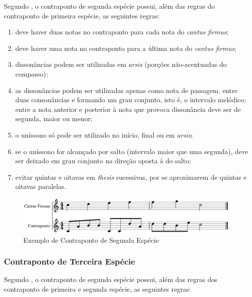         Segundo , o contraponto de segunda espécie possui, além das regras do contraponto de primeira espécie, as seguintes regras:

        \begin{enumerate}
          \item deve haver duas notas no contraponto para cada nota do \textit{cantus firmus};
          \item deve haver uma nota no contraponto para a última nota do \textit{cantus firmus};
          \item dissonâncias podem ser utilizadas em \textit{arsis} (porções não-acentuadas do compasso);
          \item as dissonâncias podem ser utilizadas apenas como nota de passagem, entre duas consonâncias e formando um grau conjunto, isto é, o intervalo melódico; entre a nota anterior e posterior à nota que provoca dissonância deve ser de segunda, maior ou menor;
          \item o uníssono só pode ser utilizado no início, final ou em \textit{arsis};
          \item se o uníssono for alcançado por salto (intervalo maior que uma segunda), deve ser deixado em grau conjunto na direção oposta à do salto;
          \item evitar quintas e oitavas em \textit{thesis} sucessivas, por se aproximarem de quintas e oitavas paralelas.
        \end{enumerate}

        \begin{figure}[htb]
          \centering
          \includegraphics[scale=0.55]{figuras/contrapontosegunda.eps}
          \caption{Exemplo de Contraponto de Segunda Espécie}
          \label{contrapontosegunda}
        \end{figure}

      \subsubsection[Contraponto de Terceira Espécie]{Contraponto de Terceira Espécie}

        Segundo , o contraponto de segunda espécie possui, além das regras dos contraponto de primeira e segunda espécie, as seguintes regras:

